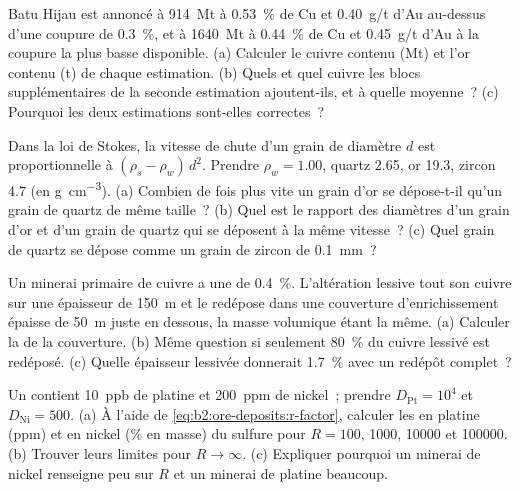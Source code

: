 \begin{exercise}[$\star$]\label{exo:b2:ore-deposits:2}
Batu Hijau est annoncé à \qty{914}{Mt} à \qty{0.53}{\percent} de Cu et \qty{0.40}{g/t} d'Au au-dessus d'une
coupure de \qty{0.3}{\percent}, et à \qty{1640}{Mt} à \qty{0.44}{\percent} de Cu et \qty{0.45}{g/t}
d'Au à la coupure la plus basse disponible. (a) Calculer le cuivre contenu (Mt) et l'or contenu (t) de
chaque estimation. (b) Quels  et quel cuivre les blocs supplémentaires de la seconde estimation
ajoutent-ils, et à quelle  moyenne~? (c) Pourquoi les deux estimations sont-elles correctes~?
\end{exercise}

\begin{exercise}[$\star$]\label{exo:b2:ore-deposits:3}
Dans la loi de Stokes, la vitesse de chute d'un grain de diamètre $d$ est proportionnelle à $(\rho_s -
\rho_w)\,d^2$. Prendre $\rho_w = 1.00$, quartz 2.65, or 19.3, zircon 4.7 (en
\unit{g.cm^{-3}}). (a) Combien de fois plus vite un grain d'or se dépose-t-il qu'un grain de quartz de même taille~?
(b) Quel est le rapport des diamètres d'un grain d'or et d'un grain de quartz qui se déposent à la même vitesse~?
(c) Quel grain de quartz se dépose comme un grain de zircon de \qty{0.1}{mm}~?
\end{exercise}

\begin{exercise}[$\star$]\label{exo:b2:ore-deposits:4}
Un minerai primaire de cuivre a une  de \qty{0.4}{\percent}. L'altération lessive tout son
cuivre sur une épaisseur de \qty{150}{m} et le redépose dans une couverture d'enrichissement
épaisse de \qty{50}{m} juste en dessous, la masse volumique étant la même. (a) Calculer la 
de la couverture. (b) Même question si seulement \qty{80}{\percent} du cuivre lessivé est redéposé.
(c) Quelle épaisseur lessivée donnerait \qty{1.7}{\percent} avec un redépôt complet~?
\end{exercise}

\begin{exercise}[$\star\star$]\label{exo:b2:ore-deposits:5}
Un  contient \qty{10}{ppb} de platine et \qty{200}{ppm} de nickel~; prendre $D_{\mathrm{Pt}} =
10^4$ et $D_{\mathrm{Ni}} = 500$. (a) À l'aide de \eqref{eq:b2:ore-deposits:r-factor}, calculer les  en platine (ppm)
et en nickel (\% en masse) du sulfure pour $R = 100$, \num{1000}, \num{10000} et \num{100000}. (b) Trouver leurs limites
pour $R \to \infty$. (c) Expliquer pourquoi un minerai de nickel renseigne peu sur $R$
et un minerai de platine beaucoup.
\end{exercise}

